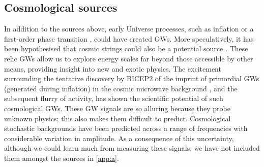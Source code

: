 \subsection{Cosmological sources}

In addition to the sources above, early Universe processes, such as inflation \citep{Grishchuk2005} or a first-order phase transition \citep{Binetruy2012}, could have created GWs. More speculatively, it has been hypothesised that cosmic strings could also be a potential source \citep{Damour2005,Binetruy2012,Aasi2014}. These relic GWs allow us to explore energy scales far beyond those accessible by other means, providing insight into new and exotic physics. The excitement surrounding the tentative discovery by BICEP2 of the imprint of primordial GWs (generated during inflation) in the cosmic microwave background \citep{Ade2014}, and the subsequent flurry of activity, has shown the scientific potential of such cosmological GWs. These GW signals are so alluring because they probe unknown physics; this also makes them difficult to predict. Cosmological stochastic backgrounds have been predicted across a range of frequencies with considerable variation in amplitude. As a consequence of this uncertainty, although we could learn much from measuring these signals, we have not included them amongst the sources in \ref{app:a}.


